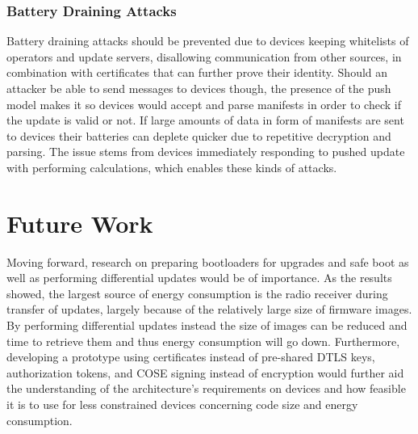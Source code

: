 \documentclass[0-thesis.tex]{subfiles}
\begin{document}
\subsubsection{Battery Draining Attacks}
Battery draining attacks should be prevented due to devices keeping whitelists of
operators and update servers, disallowing communication from other sources, in combination
with certificates that can further prove their identity. Should an attacker be able to
send messages to devices though, the presence of the push model makes it so devices would
accept and parse manifests in order to check if the update is valid or not. If large
amounts of data in form of manifests are sent to devices their batteries can deplete
quicker due to repetitive decryption and parsing. The issue stems from devices immediately
responding to pushed update with performing calculations, which enables these kinds of
attacks.


\section{Future Work}
\label{sec:future-work}
Moving forward, research on preparing bootloaders for upgrades and safe boot as well as
performing differential updates would be of importance. As the results showed, the largest
source of energy consumption is the radio receiver during transfer of updates, largely
because of the relatively large size of firmware images. By performing differential
updates instead the size of images can be reduced and time to retrieve them and thus
energy consumption will go down. Furthermore, developing a prototype using certificates
instead of pre-shared DTLS keys, authorization tokens, and COSE signing instead of
encryption would further aid the understanding of the architecture's requirements on
devices and how feasible it is to use for less constrained devices concerning code size
and energy consumption. 
\end{document}
